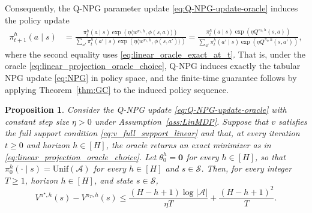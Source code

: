 \documentclass[11pt]{article}
\newtheorem{prop}{Proposition}
\begin{document}
Consequently, the Q-NPG parameter update \eqref{eq:Q-NPG-update-oracle}
induces the policy update
\begin{align}
\pi_{t+1}^h(a\mid s)
&=
\frac{
\pi_t^h(a\mid s)
\exp\!\left(\eta\langle w^{\pi_t,h},\phi(s,a)\rangle\right)
}{
\sum_{a'}\pi_t^h(a'\mid s)
\exp\!\left(\eta\langle w^{\pi_t,h},\phi(s,a')\rangle\right)
}
=
\frac{
\pi_t^h(a\mid s)
\exp\!\left(\eta Q^{\pi_t,h}(s,a)\right)
}{
\sum_{a'}\pi_t^h(a'\mid s)
\exp\!\left(\eta Q^{\pi_t,h}(s,a')\right)
},
\label{eq:linear_equals_tabular_update}
\end{align}
where the second equality uses \eqref{eq:linear_oracle_exact_at_t}. That is,
under the oracle \eqref{eq:linear_projection_oracle_choice}, Q-NPG induces
exactly the tabular NPG update \eqref{eq:NPG} in policy space, and the
finite-time guarantee follows by applying Theorem~\ref{thm:GC} to the induced
policy sequence.

\begin{prop} \label{prop:linMDP}
Consider the Q-NPG update \eqref{eq:Q-NPG-update-oracle} with constant step
size $\eta>0$ under Assumption~\ref{ass:LinMDP}. Suppose that $v$ satisfies
the full support condition \eqref{eq:v_full_support_linear} and that, at every
iteration $t\ge0$ and horizon $h\in[H]$, the oracle returns an exact minimizer
as in \eqref{eq:linear_projection_oracle_choice}. Let $\theta_0^h=\mathbf 0$
for every $h\in[H]$, so that $\pi_0^h(\cdot\mid s)=\mathrm{Unif}(\mathcal A)$
for every $h\in[H]$ and $s\in\mathcal S$. Then, for every integer $T\ge1$,
horizon $h\in[H]$, and state $s\in\mathcal S$,
\[
V^{\pi^\star,h}(s)-V^{\pi_T,h}(s)
\le
\frac{(H-h+1)\log|\mathcal A|}{\eta T}
+
\frac{(H-h+1)^2}{T}.
\]
\end{prop}
\end{document}

